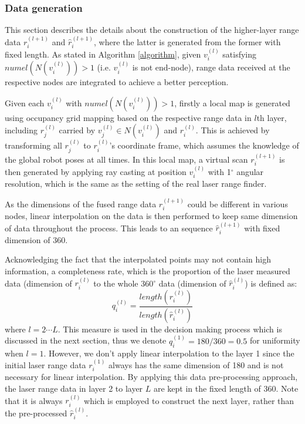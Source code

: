 \documentclass[letterpaper, 10 pt, conference]{ieeeconf}  %
\begin{document}
\subsubsection{Data generation}\label{secInter}
This section describes the details about the construction of the higher-layer range data $r_i^{(l+1)}$ and $\hat{r}_i^{(l+1)}$, where the latter is generated from the former with fixed length. As stated in Algorithm \ref{algorithm}, given $v_i^{(l)}$ satisfying $numel(N(v_i^{(l)}))>1$ (i.e. $v_i^{(l)}$ is not end-node), range data received at the respective nodes are integrated to achieve a better perception.

Given each $v_i^{(l)}$ with $numel(N(v_i^{(l)}))>1$, firstly a local map is generated using occupancy grid mapping \cite{thrun2005probabilistic} based on the respective range data in $l$th layer, including $r_j^{(l)}$ carried by $v_j^{(l)}\in N(v_i^{(l)})$ and $r_i^{(l)}$. This is achieved by transforming all $r_j^{(l)}$  to $r_i^{(l)}$'s coordinate frame, which assumes the knowledge of the global robot poses at all times.  In this local map, a virtual scan $r_{i}^{(l+1)}$ is then generated by applying ray casting at position $v_i^{(l)}$ with 1$^\circ$ angular resolution, which is the same as the setting of the real laser range finder.


As the dimensions of the fused range data $r_{i}^{(l+1)}$ could be different in various nodes,  linear interpolation on the data is then performed to keep same dimension of data throughout the process. This leads to an sequence $\hat{r}_i^{(l+1)}$ with fixed dimension of 360.

Acknowledging the fact that the interpolated points may not contain high information, a completeness rate, which is the proportion of the laser measured data (dimension of $r_i^{(l)}$ to the whole 360$^\circ$ data (dimension of $\hat{r}_i^{(l)}$) is defined as:
\begin{equation}\label{complete}
q_i^{(l)} = \frac{length(r_i^{(l)})}{length(\hat{r}_i^{(l)})}
\end{equation}
where $l=2\cdots L$. This measure is used in the decision making process which is discussed in the next section, thus we denote $q_i^{(1)}=180/360=0.5$ for uniformity when $l=1$. However, we don't apply linear interpolation to the layer 1 since the initial laser range data $r_{i}^{(1)}$ always has the same dimension of 180  and is not necessary for linear interpolation.  By applying this data pre-processing approach, the laser range data in layer 2 to layer $L$ are kept in the fixed length of 360.  Note that it is always $r_{i}^{(l)}$ which is employed to construct the next layer, rather than the pre-processed $\hat{r}_{i}^{(l)}$.
\end{document}
